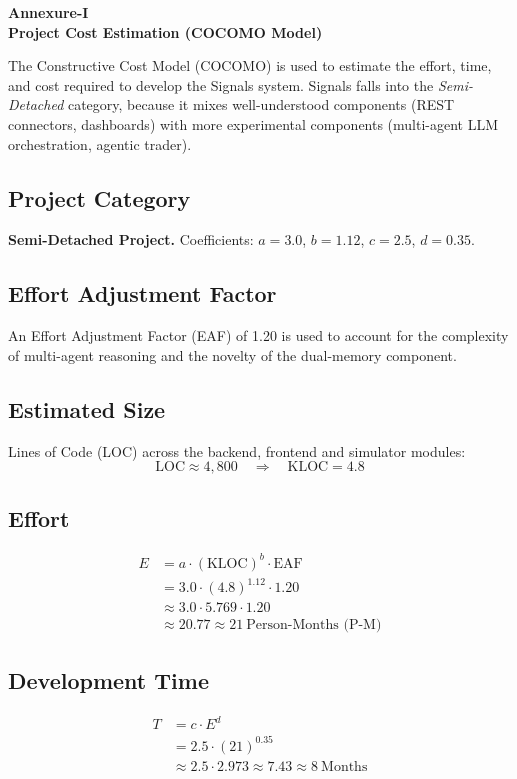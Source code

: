 \documentclass[12pt,a4paper,oneside,openany]{book}
\begin{document}
\begin{itemize}[leftmargin=8mm]
\begin{center}
  {\fontsize{18}{22}\selectfont\bfseries Annexure-I}\\[4mm]
  {\fontsize{16}{20}\selectfont\bfseries Project Cost Estimation (COCOMO Model)}\\[10mm]
\end{center}

The Constructive Cost Model (COCOMO) is used to estimate the effort, time, and cost required to develop the Signals system. Signals falls into the \textit{Semi-Detached} category, because it mixes well-understood components (REST connectors, dashboards) with more experimental components (multi-agent LLM orchestration, agentic trader).

\subsection*{Project Category}
\textbf{Semi-Detached Project.} Coefficients: $a = 3.0$, $b = 1.12$, $c = 2.5$, $d = 0.35$.

\subsection*{Effort Adjustment Factor}
An Effort Adjustment Factor (EAF) of 1.20 is used to account for the complexity of multi-agent reasoning and the novelty of the dual-memory component.

\subsection*{Estimated Size}
Lines of Code (LOC) across the backend, frontend and simulator modules:
\[
\text{LOC} \approx 4{,}800 \quad\Rightarrow\quad \text{KLOC} = 4.8
\]

\subsection*{Effort}
\begin{align*}
E &= a \cdot (\text{KLOC})^{b} \cdot \text{EAF}\\
  &= 3.0 \cdot (4.8)^{1.12} \cdot 1.20\\
  &\approx 3.0 \cdot 5.769 \cdot 1.20\\
  &\approx 20.77 \approx 21\ \text{Person-Months (P-M)}
\end{align*}

\subsection*{Development Time}
\begin{align*}
T &= c \cdot E^{d}\\
  &= 2.5 \cdot (21)^{0.35}\\
  &\approx 2.5 \cdot 2.973 \approx 7.43 \approx 8\ \text{Months}
\end{align*}


\end{itemize}
\end{document}
